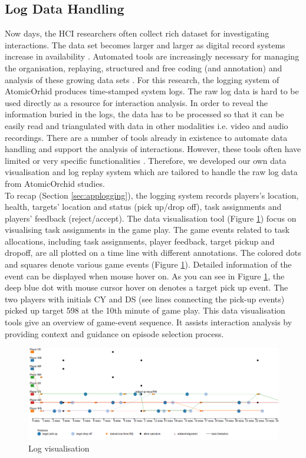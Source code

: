 \subsection{Log Data Handling} \label{sec:aprloghandling}
Now days, the \acf{HCI} researchers often collect rich dataset for investigating interactions. The data set becomes larger and larger as digital record systems increase in availability \cite{Brundell}. Automated tools are increasingly necessary for managing the organisation, replaying, structured and free coding (and annotation) and analysis of these growing data sets \cite{Brundell}. For this research, the logging system of AtomicOrhid produces time-stamped system logs. The raw log data is hard to be used directly as a resource for interaction analysis. In order to reveal the information buried in the logs, the data has to be processed so that it can be easily read and triangulated with data in other modalities i.e.  video and audio recordings. There are a number of tools already in existence to automate data handling and support the analysis of interactions. However, these tools often have limited or very specific functionalities \cite{Brundell}. Therefore, we developed our own data visualisation and log replay system which are tailored to handle the raw log data from AtomicOrchid studies.\\

To recap (Section \ref{sec:applogging}), the logging system records players's location, health, targets' location and status (pick up/drop off), task assignments and players' feedback (reject/accept). The data visualisation tool (Figure \ref{fig:logvis}) focus on visualising task assignments in the game play. The game events related to task allocations, including task assignments, player feedback, target pickup and dropoff, are all plotted on a time line with different annotations. The colored dots and squares denote various game events (Figure \ref{fig:logvis}). Detailed information of the event can be displayed when mouse hover on. As you can see in Figure \ref{fig:logvis}, the deep blue dot with mouse cursor hover on denotes a target pick up event. The two players with initials CY and DS (see lines connecting the pick-up events) picked up target 598 at the 10th minute of game play. This data visualisation tools give an overview of game-event sequence. It assists interaction analysis by providing context and guidance on episode selection process. \\

\begin{figure}[h]
  \centering
  \includegraphics[width=1\textwidth]{img/methodology/logVisualisation}
  \caption{Log visualisation}
  \label{fig:logvis}
\end{figure}

